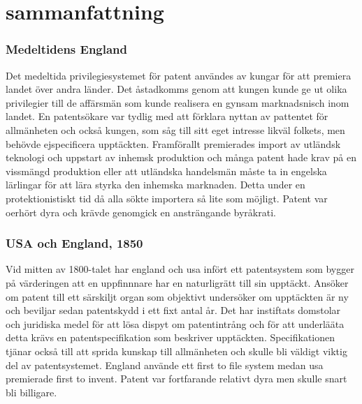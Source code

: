 \section{sammanfattning}
\label{sec:samm}


\subsubsection{Medeltidens England}

Det medeltida privilegiesystemet för patent användes av kungar för att premiera landet över andra länder. Det åstadkomms genom att kungen kunde ge ut olika privilegier till de affärsmän som kunde realisera en gynsam marknadsnisch inom landet. En patentsökare var tydlig med att förklara nyttan av pattentet för allmänheten och också kungen, som såg till sitt eget intresse likväl folkets, men behövde ejspecificera upptäckten. Framförallt premierades import av utländsk teknologi och uppstart av inhemsk produktion och många patent hade krav på en vissmängd produktion eller att utländska handelsmän måste ta in engelska lärlingar för att lära styrka den inhemska marknaden. Detta under en protektionistiskt tid då alla sökte importera så lite som möjligt. Patent var oerhört dyra och krävde genomgick en ansträngande byråkrati.

\subsubsection{USA och England, 1850}

Vid mitten av 1800-talet har england och usa infört ett patentsystem som bygger på värderingen att en uppfinnnare har en naturligrätt till sin upptäckt. Ansöker om patent till ett särskiljt organ som objektivt undersöker om upptäckten är ny och beviljar sedan patentskydd i ett fixt antal år. Det har instiftats domstolar och juridiska medel för att lösa dispyt om patentintrång och för att underlääta detta krävs en patentspecifikation som beskriver upptäckten. Specifikationen tjänar också till att sprida kunskap till allmänheten och skulle bli väldigt viktig del av patentsystemet. England använde ett first to file system medan usa premierade first to invent. Patent var fortfarande relativt dyra men skulle snart bli billigare.

